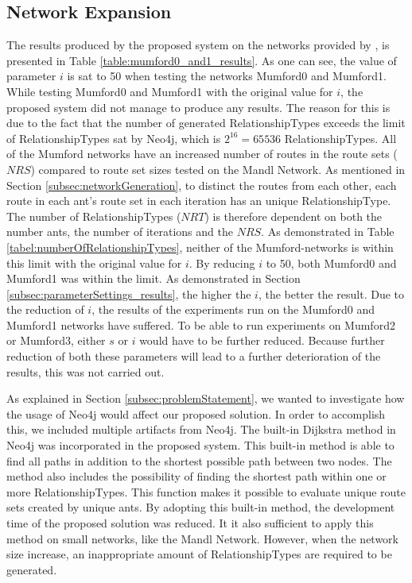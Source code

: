 \subsection{Network Expansion}
\label{subsec:networkExpansion}

The results produced by the proposed system on the networks provided by \citet{mumford13}, is presented in  Table \vref{table:mumford0_and1_results}. As one can see, the value of parameter $i$ is sat to 50 when testing the networks Mumford0 and Mumford1. While testing Mumford0 and Mumford1 with the original value for $i$, the proposed system did not manage to produce any results. The reason for this is due to the fact that the number of generated RelationshipTypes exceeds the limit of RelationshipTypes sat by Neo4j, which is $2^{16} = 65 536$ RelationshipTypes. All of the Mumford networks have an increased number of routes in the route sets ($NRS$) compared to route set sizes tested on the Mandl Network. As mentioned in Section \vref{subsec:networkGeneration}, to distinct the routes from each other, each route in each ant's route set in each iteration has an unique RelationshipType. The number of RelationshipTypes ($NRT$) is therefore dependent on both the number ants, the number of iterations and the $NRS$. As demonstrated in Table \vref{tabel:numberOfRelationshipTypes}, neither of the Mumford-networks is within this limit with the original value for $i$. By reducing $i$ to 50, both Mumford0 and Mumford1 was within the limit. As demonstrated in Section \vref{subsec:parameterSettings_results}, the higher the $i$, the better the result. Due to the reduction of $i$, the results of the experiments run on the Mumford0 and Mumford1 networks have suffered. To be able to run experiments on Mumford2 or Mumford3, either $s$ or $i$ would have to be further reduced. Because further reduction of both these parameters will lead to a further deterioration of the results, this was not carried out.

As explained in Section \vref{subsec:problemStatement}, we wanted to investigate how the usage of Neo4j would affect our proposed solution. In order to accomplish this, we included multiple artifacts from Neo4j.  The built-in Dijkstra method in Neo4j was incorporated in the proposed system. This built-in method is able to find all paths in addition to the shortest possible path between two nodes. The method also includes the possibility of finding the shortest path within one or more RelationshipTypes. This function makes it possible to evaluate unique route sets created by unique ants. By adopting this built-in method, the development time of the proposed solution was reduced. It it also sufficient to apply this method on small networks, like the Mandl Network. However, when the network size increase, an inappropriate amount of RelationshipTypes are required to be generated.
\newline

